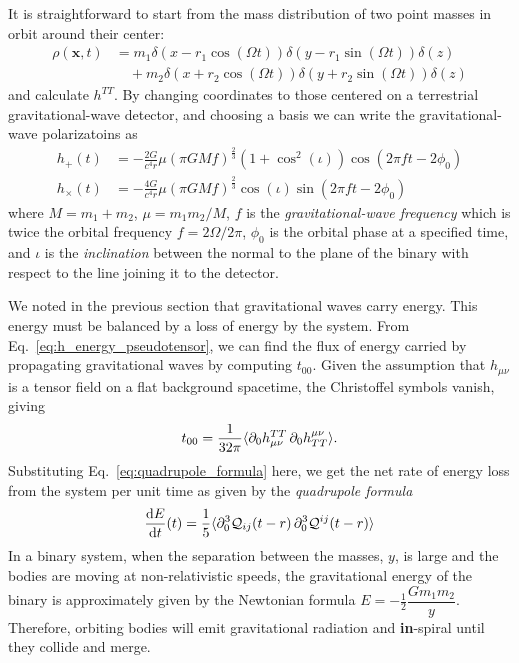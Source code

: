 It is straightforward to start from the mass distribution of two point
masses in orbit around their center:
%
\begin{align*}
\rho(\mathbf{x},t) &= m_1\delta(x - r_1\cos(\Omega t)) \delta(y-r_1
\sin(\Omega t)) \delta(z) \\
&\quad + m_2\delta(x + r_2\cos(\Omega t)) \delta(y + r_2 \sin(\Omega t))
\delta(z)
\end{align*}
%
and calculate $h^{TT}$. By changing coordinates to those centered on a
terrestrial gravitational-wave detector, and choosing a basis we can write the 
gravitational-wave polarizatoins as~\cite{Brown:2004vh}
%
\begin{align}
\label{eq:h_plus_cross}
h_+(t)   &= - \frac{2G}{c^4 r} \mu (\pi G M f)^{\frac{2}{3}}
(1+\cos^2(\iota)) \cos(2\pi f t - 2\phi_0) \\ \nonumber
h_\times(t)  &= - \frac{4G}{c^4 r} \mu (\pi G M f)^{\frac{2}{3}}
\cos(\iota) \sin(2\pi f t - 2\phi_0) \nonumber
\end{align}
%
where $M = m_1+m_2$, $\mu = m_1 m_2 / M$, $f$ is the 
\emph{gravitational-wave frequency} which is twice the orbital frequency 
$f = 2\Omega/2\pi$, $\phi_0$ is the orbital phase at a specified time, and 
$\iota$ is the \emph{inclination} between the normal to the plane of the binary
with respect to the line joining it to the detector.

We noted in the previous section that gravitational waves carry energy. This
energy must be balanced by a loss of energy by the system. From 
Eq.~\ref{eq:h_energy_pseudotensor}, we can find the flux of energy carried by 
propagating gravitational waves by computing $t_{00}$. Given the assumption 
that $h_{\mu\nu}$ is a tensor field on a flat background spacetime, the 
Christoffel symbols vanish, giving
%
\begin{equation}
 t_{00} = \frac{1}{32\pi} \langle\partial_0 h_{\mu\nu}^{TT}\,\partial_0 h^{\mu\nu}_{TT} \rangle.
\end{equation}
%
Substituting Eq.~\ref{eq:quadrupole_formula} here, we get the net rate of 
energy loss from the system per unit time as given by the {\it quadrupole 
formula}
%
\begin{equation}
\label{eq:energy_loss}
\frac{\D E}{\D t}(t) = \frac{1}{5}\langle \pd_0^3\Quad_{ij}(t-r)\,\pd_0^3\Quad^{ij}(t-r)\rangle
\end{equation}
%
In a binary system, when the separation between the masses, $y$, is large 
and the bodies are moving at non-relativistic speeds, the gravitational 
energy of the binary is approximately given by the Newtonian formula
$E = - \frac{1}{2} \dfrac{G m_1 m_2}{y}$.
Therefore, orbiting bodies will emit gravitational radiation and 
{\bf in}-spiral until they collide and merge.

